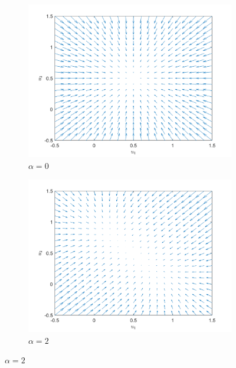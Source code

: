 \iftrue
   \begin{figure}
        \begin{subfigure}[b]{0.475\textwidth}
            \centering
            \includegraphics[width=\textwidth]{text/analysis/fig/2by2monotone/espi_0.png}
            \caption{\small $\alpha=0$}
            \label{fig:mean and std of net14}
        \end{subfigure}
        \hfill
        \begin{subfigure}[b]{0.475\textwidth}  
            \centering 
            \includegraphics[width=\textwidth]{text/analysis/fig/2by2monotone/espi_2.png}
            \caption{$\alpha=2$}
            \label{fig:mean and std of net24}
        \end{subfigure}

\end{figure}
